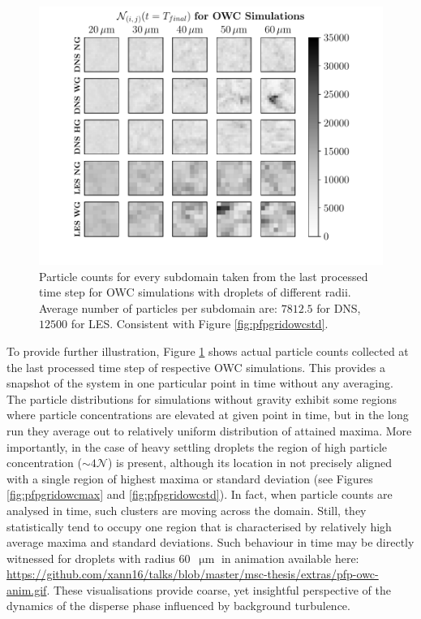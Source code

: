 \documentclass{pracamgren}
\begin{document}
\begin{figure}[!h]
\centering
\includegraphics[width=13.5cm]{figures/3-20_pfpgridowclast.pdf}
\caption{
Particle counts for every subdomain taken from the last processed time step for OWC simulations with droplets of different radii.
Average number of particles per subdomain are: $7 812.5$ for DNS, $12 500$ for LES.
Consistent with Figure \ref{fig:pfpgridowcstd}.
}
\label{fig:pfpgridowclast}
\end{figure}

To provide further illustration, Figure \ref{fig:pfpgridowclast} shows actual particle counts collected at the last processed time step of respective OWC simulations.
This provides a snapshot of the system in one particular point in time without any averaging.  
The particle distributions for simulations without gravity exhibit some regions where particle concentrations are elevated at given point in time, but in the long run they average out to relatively uniform distribution of attained maxima. 
More importantly, in the case of heavy settling droplets the region of high particle concentration (${\sim 4 \mathcal{N}}$) is present, although its location in not precisely aligned with a single region of highest maxima or standard deviation (see Figures \ref{fig:pfpgridowcmax} and \ref{fig:pfpgridowcstd}).
In fact, when particle counts are analysed in time, such clusters are moving across the domain.
Still, they statistically tend to occupy one region that is characterised by relatively high average maxima and standard deviations.
Such behaviour in time may be directly witnessed for droplets with radius $60$~$\upmu\text{m}$ in animation available here: \url{https://github.com/xann16/talks/blob/master/msc-thesis/extras/pfp-owc-anim.gif}.
These visualisations provide coarse, yet insightful perspective of the dynamics of the disperse phase influenced by background turbulence.
\end{document}
